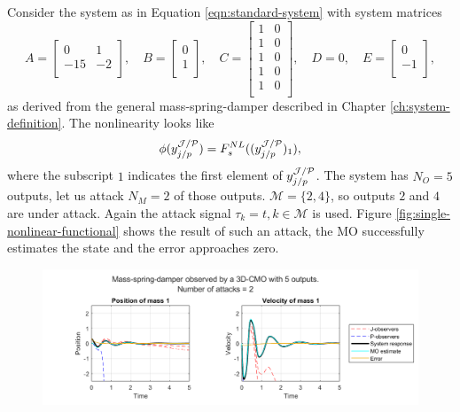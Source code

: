 \begin{example}\label{ex:single-mass-nonlinear-example}
    Consider the system as in Equation \eqref{eqn:standard-system} with system matrices
    \begin{equation*}
        A =
        \begin{bmatrix}
            0 & 1 \\ -15 & -2 \\
        \end{bmatrix}, \quad
        B =
        \begin{bmatrix}
            0 \\ 1 \\
        \end{bmatrix}, \quad
        C = 
        \begin{bmatrix}
            1 & 0 \\ 1 & 0 \\ 1 & 0 \\ 1 & 0 \\ 1 & 0 \\
        \end{bmatrix}, \quad
        D = 0, \quad
        E =
        \begin{bmatrix}
            0 \\ -1 \\
        \end{bmatrix},   
    \end{equation*}
    as derived from the general mass-spring-damper described in Chapter \ref{ch:system-definition}.  The nonlinearity looks like
    \begin{equation*}
        \phi(y^{\mathcal{J}/\mathcal{P}}_{j/p}) = F^{NL}_s((y^{\mathcal{J}/\mathcal{P}}_{j/p})_1),
    \end{equation*}
    where the subscript $1$ indicates the first element of $y^{\mathcal{J}/\mathcal{P}}_{j/p}$. The system has $N_O=5$ outputs, let us attack $N_M=2$ of those outputs. $\mathcal{M}=\{2,4\}$, so outputs $2$ and $4$ are under attack. Again the attack signal $\tau_k=t,k \in \mathcal{M}$ is used. Figure \ref{fig:single-nonlinear-functional} shows the result of such an attack, the MO successfully estimates the state and the error approaches zero. 
    \begin{figure}[H]
        \centering
        \includegraphics[width=\linewidth]{report/Figures/single-nonnlinear-functional.png}

\end{figure}
\end{example}
